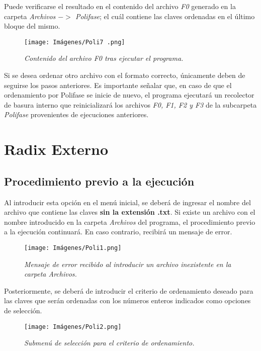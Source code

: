 \documentclass[letterpaper,12pt]{extarticle}
\begin{document}
Puede verificarse el resultado en el contenido del archivo \textit{F0} generado en la carpeta \textit{Archivos $->$ Polifase}; el cuál contiene las claves ordenadas en el último bloque del mismo.

\begin{figure}[h!]
\centering
\texttt{[image: Imágenes/Poli7 .png]}
\caption{\textit{Contenido del archivo F0 tras ejecutar el programa.}}
\label{fig:Poli56}
\end{figure}

Si se desea ordenar otro archivo con el formato correcto, únicamente deben de seguirse los pasos anteriores. Es importante señalar que, en caso de que el ordenamiento por Polifase se inicie de nuevo, el programa ejecutará un recolector de basura interno que reinicializará los archivos \textit{F0, F1, F2 y F3} de la subcarpeta \textit{Polifase} provenientes de ejecuciones anteriores.

\section{Radix Externo}

\subsection{Procedimiento previo a la ejecución}

\noindent Al introducir esta opción en el menú inicial, se deberá de ingresar el nombre del archivo que contiene las claves \textbf{sin la extensión .txt}. Si existe un archivo con el nombre introducido en la carpeta \textit{Archivos} del programa, el procedimiento previo a la ejecución continuará. En caso contrario, recibirá un mensaje de error.


\begin{figure}[h!]
\centering
\texttt{[image: Imágenes/Poli1.png]}
\caption{\textit{Mensaje de error recibido al introducir un archivo inexistente en la carpeta Archivos.}}
\label{fig:Poli1}
\end{figure}

Posteriormente, se deberá de introducir el criterio de ordenamiento deseado para las claves que serán ordenadas con los números enteros indicados como opciones de selección.

\begin{figure}[h!]
\centering
\texttt{[image: Imágenes/Poli2.png]}
\caption{\textit{Submenú de selección para el criterio de ordenamiento.}}
\label{fig:Poli2}
\end{figure}
\end{document}
